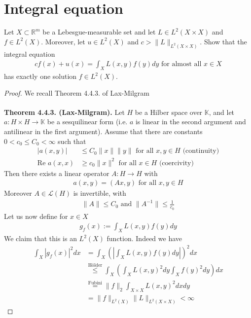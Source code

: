 \documentclass[12pt,a4paper]{article}
\begin{document}
\section{Integral equation}
Let $X \subset \mathbb{R}^m$ be a Lebesgue-measurable set and let $L \in L^2(X \times X)$ and $f \in L^2(X)$. Moreover,  let $u \in L^2(X)$ and $c> \|L\|_{L^2(X \times X)}$. Show that the integral equation 
\begin{align*}
cf(x) + u(x) = \int_X L(x,y) f(y)dy \text{ for almost all } x \in X 
\end{align*}
has exactly one solution $f \in L^2(X)$. 
\begin{proof}
We recall Theorem 4.4.3. of Lax-Milgram
\\\\
\textbf{Theorem 4.4.3. (Lax-Milgram).} Let $H$ be a Hilber space over $\mathbb{K}$, and let $a:H \times H \to \mathbb{K}$ be a sesquilinear form (i.e. $a$ is linear in the second argument and antilinear in the first argument). Assume that there are constants $0 <c_0 \leq C_0 < \infty$ such that
\begin{align*}
|a(x,y)| & \leq C_0 \|x \| \|y \| \text{ for all } x,y \in H \text{ (continuity)} \\
\text{Re }a (x,x) & \geq c_0 \| x \|^2 \text{ for all } x \in H \text{ (coercivity)}
\end{align*}
Then there exists a linear operator $A: H \to H$ with 
\begin{align*}
a(x,y)=(Ax,y) \text{ for all } x,y \in H 
\end{align*}
Moreover $A \in \mathcal{L}(H)$ is invertible, with 
\begin{align*}
\| A \| \leq C_0 \text{ and } \|A^{-1}\| \leq \frac{1}{c_0}
\end{align*}
Let us now define for $x \in X$ \begin{align*}
g_f(x):= \int_X L(x,y) f(y) dy 
\end{align*}
We claim that this is an $L^2(X)$ function. Indeed we have
\begin{align*}
\int_X |g_f(x)|^2 dx &= \int_X \left( \left| \int_X L(x,y)f(y)dy \right| \right)^2 dx \\
& \overset{\text{Hölder}}\leq \int_X \left( \int_X L(x,y)^2dy \int_X f(y)^2 dy \right) dx  \\
&\overset{\text{Fubini}}= \|f\|_2 \int_{X \times X} L(x,y)^2 dx dy \\ &  = \|f\|_{L^2(X)} \|L\|_{L^2(X \times X)}  < \infty 
\end{align*}

\end{proof}
\end{document}
